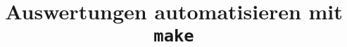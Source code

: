 

\title[\texttt{make}]{Auswertungen automatisieren mit \texttt{make}}



{
  \begin{frame}
    \titlepage
  \end{frame}
}




